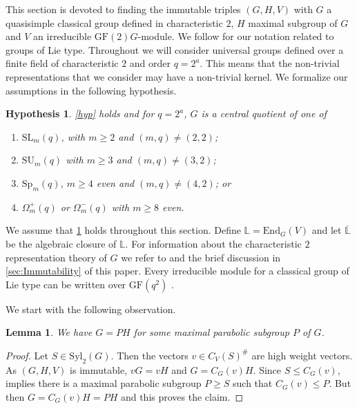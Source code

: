 \documentclass[12pt]{amsart}
\newtheorem{lemma}[theorem]{Lemma}
\newtheorem{hypothesis}[theorem]{Hypothesis}
\theoremstyle{remark}
\theoremstyle{notation}
\theoremstyle{definition}
\newcommand{\SU}{\mathrm{SU}}
\newcommand{\Syl}{\mathrm{Syl}}\newcommand{\syl}{\mathrm{Syl}}
\newcommand{\GF}{\mathrm{GF}}
\newcommand{\Sp}{\mathrm{Sp}}
\newcommand{\SL}{\mathrm{SL}}
\newcommand{\0}{\emptyset}
\begin{document}
This section is devoted to finding the immutable triples $(G,H,V)$ with $G$ a quasisimple   classical group defined in  characteristic $2$, $H$ maximal subgroup of $G$ and $V$ an irreducible $\GF(2)G$-module. We follow \cite[Section 2]{GLS3} for our notation related to groups of Lie type. Throughout we will consider universal groups defined over a finite field of characteristic $2$ and order $q=2^a$.  This means that the non-trivial representations that we consider  may have a non-trivial kernel. We formalize our assumptions  in the following hypothesis.

\begin{hypothesis}\label{hypss7} \cref{hyp} holds and for $q=2^a$,   $G$ is a central quotient of one of
\begin{enumerate}
 \item $\SL_m(q)$, with $m \ge 2$ and $(m,q) \ne (2,2)$;
  \item $\SU_m(q)$ with $m \ge 3$ and $(m,q) \ne (3,2)$;
  \item $\Sp_{m}(q)$, $m \ge 4$ even and $(m,q) \ne (4,2)$; or
  \item $\Omega_{m}^+(q)$  or $\Omega_{m}^-(q)$ with $m \ge 8$ even.
   \end{enumerate}
\end{hypothesis}

We assume that \cref{hypss7}   holds throughout this section. Define $\mathbb L=\mathrm{End}_G(V)$ and let $\overline{\mathbb L}$  be the algebraic closure of $\mathbb L$. For information about the characteristic $2$ representation theory of $G$ we refer to \cite[Section 2.8]{GLS3} and the brief discussion in  \cref{sec:Immutability} of this paper. Every irreducible module for a classical group of Lie type can be written over $\GF(q^2)$ \cite[Proposition 5.4.4]{KleidmanLiebeck}.



We start with the following observation.

\begin{lemma}\label{lem:parabolic factorisation}  We have $G= PH$ for some maximal parabolic subgroup $P$ of $G$.
\end{lemma}


\begin{proof} Let    $S \in \Syl_2(G)$.  Then the vectors $v \in C_V(S)^\#$ are high weight vectors. As $(G,H,V)$ is immutable, $vG= vH$ and $G= C_G(v)H$. Since $S \le C_G(v)$, \cite[Theorem 2.6.7]{GLS3} implies there is a maximal parabolic subgroup $P \ge S$ such that $C_G(v) \le P$. But then  $G=C_G(v)H=PH$ and this proves the claim. \end{proof}
\end{document}
